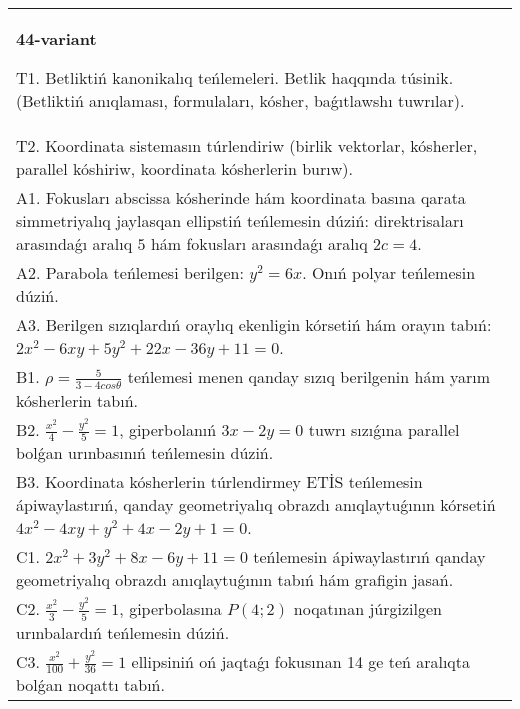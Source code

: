 \documentclass{article}
\begin{document}
\begin{tabular}{m{17cm}}
\textbf{44-variant}
\newline

T1. Betliktiń kanonikalıq teńlemeleri. Betlik haqqında túsinik. (Betliktiń anıqlaması, formulaları, kósher, baǵıtlawshı tuwrılar).\\

T2. Koordinata sistemasın túrlendiriw (birlik vektorlar, kósherler, parallel kóshiriw, koordinata kósherlerin burıw).\\

A1. Fokusları abscissa kósherinde hám koordinata basına qarata simmetriyalıq jaylasqan ellipstiń teńlemesin dúziń: direktrisaları arasındaǵı aralıq $5$ hám fokusları arasındaǵı aralıq $2 c=4$.\\

A2. Parabola teńlemesi berilgen: $y^2=6 x$. Onıń polyar teńlemesin dúziń.\\

A3. Berilgen sızıqlardıń oraylıq ekenligin kórsetiń hám orayın tabıń: $2 x^{2}-6 xy+5 y^{2}+22 x-36 y+11=0$.\\

B1. $\rho = \frac{5}{3 - 4cos\theta}$ teńlemesi menen qanday sızıq berilgenin hám yarım kósherlerin tabıń.  \\

B2. $\frac{x^{2}}{4} - \frac{y^{2}}{5} = 1$, giperbolanıń $3x - 2y = 0$ tuwrı sızıǵına parallel bolǵan urınbasınıń teńlemesin dúziń.  \\

B3. Koordinata kósherlerin túrlendirmey ETİS teńlemesin ápiwaylastırıń, qanday geometriyalıq obrazdı anıqlaytuǵının kórsetiń $4x^{2} - 4xy + y^{2} + 4x - 2y + 1 = 0$.  \\

C1. $2x^{2} + 3y^{2} + 8x - 6y + 11 = 0$ teńlemesin ápiwaylastırıń qanday geometriyalıq obrazdı anıqlaytuǵının tabıń hám grafigin jasań.  \\

C2. $\frac{x^{2}}{3} - \frac{y^{2}}{5} = 1$, giperbolasına $P(4;2)$ noqatınan júrgizilgen urınbalardıń teńlemesin dúziń.  \\

C3. $\frac{x^{2}}{100} + \frac{y^{2}}{36} = 1$ ellipsiniń oń jaqtaǵı fokusınan 14 ge teń aralıqta bolǵan noqattı tabıń.  \\

\end{tabular}
\vspace{1cm}
\end{document}
